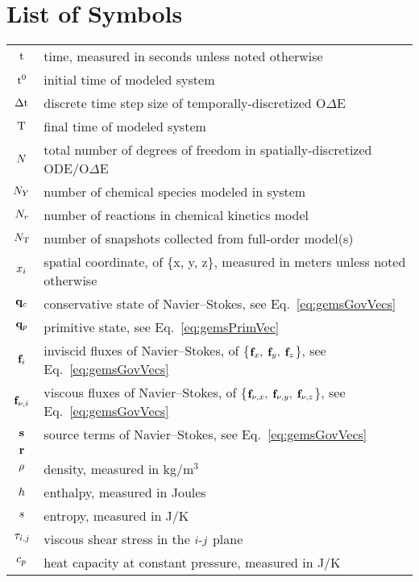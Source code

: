 \chapter*{List of Symbols}\label{list:symbols}

\begin{longtable}{cp{}}
	$\text{t}$ & time, measured in seconds unless noted otherwise \\
	$\text{t}^0$ & initial time of modeled system \\
	$\Delta \text{t}$ & discrete time step size of temporally-discretized O$\Delta$E \\
	$\text{T}$ & final time of modeled system \\
	$N$ & total number of degrees of freedom in spatially-discretized ODE/O$\Delta$E \\
	$N_Y$ & number of chemical species modeled in system\\
	$N_r$ & number of reactions in chemical kinetics model \\
	$N_{\text{T}}$ & number of snapshots collected from full-order model(s) \\
	$x_{i}$ & spatial coordinate, of \{x, y, z\}, measured in meters unless noted otherwise \\
	$\mathbf{q}_{c}$ & conservative state of Navier--Stokes, see Eq.~\ref{eq:gemsGovVecs} \\
	$\mathbf{q}_{p}$ & primitive state, see Eq.~\ref{eq:gemsPrimVec}  \\
	$\mathbf{f}_{i}$ & inviscid fluxes of Navier--Stokes, of \{$\mathbf{f}_x, \; \mathbf{f}_y, \; \mathbf{f}_z$\}, see Eq.~\ref{eq:gemsGovVecs} \\
	$\mathbf{f}_{\nu,i}$ & viscous fluxes of Navier--Stokes, of \{$\mathbf{f}_{\nu,x}, \;\mathbf{f}_{\nu,y}, \; \mathbf{f}_{\nu,z}$\}, see Eq.~\ref{eq:gemsGovVecs} \\
	$\mathbf{s}$ & source terms of Navier--Stokes, see Eq.~\ref{eq:gemsGovVecs} \\
	$\mathbf{r}$ & \\
	$\rho$ & density, measured in kg/m$^3$ \\
	$h$ & enthalpy, measured in Joules \\
	$s$ & entropy, measured in J/K \\
	$\tau_{i,j}$ & viscous shear stress in the $i\text{-}j$ plane \\
	$c_{p}$ & heat capacity at constant pressure, measured in J/K \\

\end{longtable}
